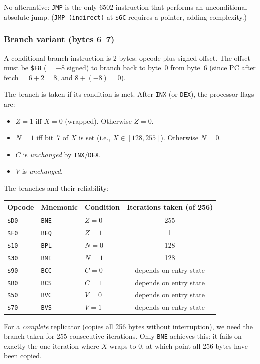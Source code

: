 \documentclass{article}
\newcommand{\hex}[1]{\texttt{\$#1}}
\newcommand{\opcode}[1]{\texttt{#1}}
\begin{document}
No alternative: \opcode{JMP} is the only 6502 instruction that performs
an unconditional absolute jump. (\opcode{JMP (indirect)} at \hex{6C}
requires a pointer, adding complexity.)

\subsubsection{Branch variant (bytes 6--7)}

A conditional branch instruction is 2 bytes: opcode plus signed offset.
The offset must be \hex{F8} ($= -8$ signed) to branch back to byte~0
from byte~6 (since PC after fetch = $6 + 2 = 8$, and $8 + (-8) = 0$).

The branch is taken if its condition is met. After \opcode{INX} (or
\opcode{DEX}), the processor flags are:
\begin{itemize}
\item $Z = 1$ iff $X = 0$ (wrapped). Otherwise $Z = 0$.
\item $N = 1$ iff bit~7 of $X$ is set (i.e., $X \in [128, 255]$).
  Otherwise $N = 0$.
\item $C$ is \emph{unchanged} by \opcode{INX}/\opcode{DEX}.
\item $V$ is \emph{unchanged}.
\end{itemize}

The branches and their reliability:

\begin{center}
\begin{tabular}{lllc}
\toprule
Opcode & Mnemonic & Condition & Iterations taken (of 256) \\
\midrule
\hex{D0} & \opcode{BNE} & $Z = 0$ & 255 \\
\hex{F0} & \opcode{BEQ} & $Z = 1$ & 1 \\
\hex{10} & \opcode{BPL} & $N = 0$ & 128 \\
\hex{30} & \opcode{BMI} & $N = 1$ & 128 \\
\hex{90} & \opcode{BCC} & $C = 0$ & depends on entry state \\
\hex{B0} & \opcode{BCS} & $C = 1$ & depends on entry state \\
\hex{50} & \opcode{BVC} & $V = 0$ & depends on entry state \\
\hex{70} & \opcode{BVS} & $V = 1$ & depends on entry state \\
\bottomrule
\end{tabular}
\end{center}

For a \emph{complete} replicator (copies all 256 bytes without
interruption), we need the branch taken for 255 consecutive iterations.
Only \opcode{BNE} achieves this: it fails on exactly the one iteration
where $X$ wraps to 0, at which point all 256 bytes have been copied.
\end{document}
